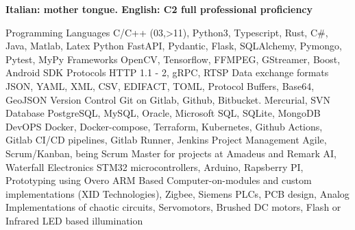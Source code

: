 \begin{cvskills}
    \cvskill
    {} %
    {\textbf{Italian: mother tongue.
     English: C2 full professional proficiency}} %
\end{cvskills}




\begin{cvskills}

\cvskill
    {Programming Languages} %
    {C/C++ (03,>11), Python3, Typescript, Rust, C\#, Java, Matlab, Latex} %
\cvskill
    {Python} %
    {FastAPI, Pydantic, Flask, SQLAlchemy, Pymongo, Pytest, MyPy} %
\cvskill
    {Frameworks} %
    {OpenCV, Tensorflow, FFMPEG, GStreamer, Boost, Android SDK} %
\cvskill
    {Protocols} %
    {HTTP 1.1 - 2, gRPC, RTSP} %
\cvskill
    {Data exchange formats} %
    {JSON, YAML, XML, CSV, EDIFACT, TOML, Protocol Buffers, Base64, GeoJSON} %
\cvskill
    {Version Control} %
    {Git on Gitlab, Github, Bitbucket. Mercurial, SVN} %
\cvskill
    {Database} %
    {PostgreSQL, MySQL, Oracle, Microsoft SQL, SQLite, MongoDB} %
\cvskill
    {DevOPS} %
    {Docker, Docker-compose, Terraform, Kubernetes, Github Actions, Gitlab CI/CD pipelines, Gitlab Runner, Jenkins} %
\cvskill
    {Project Management} %
    {Agile, Scrum/Kanban, being Scrum Master for projects at Amadeus and Remark AI, Waterfall} %
\cvskill
    {Electronics} %
    {STM32 microcontrollers, Arduino, Rapsberry PI, Prototyping using Overo ARM Based Computer-on-modules and custom implementations (XID Technologies),
     Zigbee, Siemens PLCs, PCB design, Analog Implementations of chaotic circuits, Servomotors, Brushed DC motors, Flash or Infrared LED based illumination} %

\end{cvskills}
